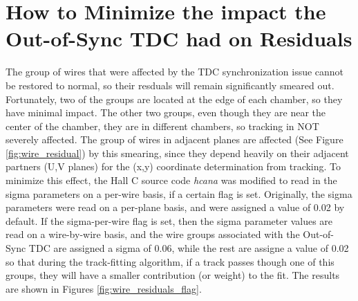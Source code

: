 \documentclass[11pt]{article}
\begin{document}
\section{How to Minimize the impact the Out-of-Sync TDC had on Residuals }
\noindent The group of wires that were affected by the TDC synchronization issue cannot be restored to normal, so their resduals will remain significantly smeared out. Fortunately,
two of the groups are located at the edge of each chamber, so they have minimal impact. The other two groups, even though they are near the center of the chamber, they are
in different chambers, so tracking in NOT severely affected. The group of wires in adjacent planes are affected (See Figure \ref{fig:wire_residual}) by this smearing, since
they depend heavily on their adjacent partners (U,V planes) for the (x,y) coordinate determination from tracking. To minimize this effect, the Hall C source code \textit{hcana}
was modified to read in the sigma parameters on a per-wire basis, if a certain flag is set. Originally, the sigma parameters were read on a per-plane basis, and were assigned a
value of 0.02 by default. If the sigma-per-wire flag is set, then the sigma parameter values are read on a wire-by-wire basis, and the wire groups associated with the
Out-of-Sync TDC are assigned a sigma of 0.06, while the rest are assigne a value of 0.02 so that during the track-fitting algorithm, if a track passes though one of this groups,
they will have a smaller contribution (or weight) to the fit. The results are shown in Figures \ref{fig:wire_residuals_flag}.
\end{document}
